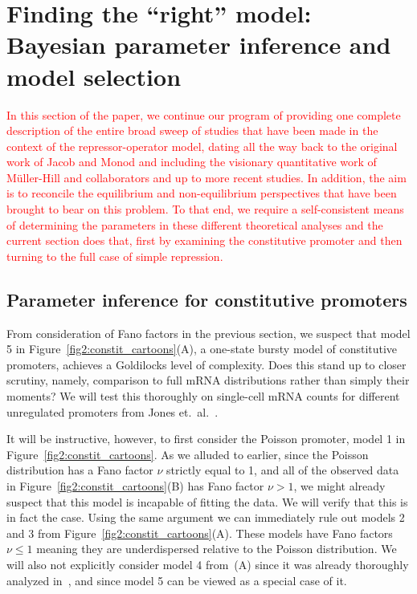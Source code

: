 \section{Finding the ``right'' model: Bayesian parameter inference and model 
selection}
\label{section_04_bayesian_inference}

\textcolor{red}{In this section of the paper, we continue our program of providing
one complete description of the entire broad sweep of studies
that have been made in the context of the repressor-operator model,
dating all the way back to the original work of Jacob and Monod
and including the visionary quantitative work of M\"{u}ller-Hill and collaborators
and up to more recent studies.   In addition, the aim is to reconcile the 
equilibrium and non-equilibrium perspectives that have been brought
to bear on this problem.  To that end, we require a self-consistent means
of determining the parameters in these different theoretical analyses and
the current section does that, first by examining the constitutive promoter
and then turning to the full case of simple repression. }


\subsection{Parameter inference for constitutive promoters}

From consideration of Fano factors in the previous section, we suspect that
model 5 in Figure~\ref{fig2:constit_cartoons}(A), a one-state bursty model of
constitutive promoters, achieves a Goldilocks level of complexity. Does this
stand up to closer scrutiny, namely, comparison to full mRNA distributions
rather than simply their moments? We will test this thoroughly on
single-cell mRNA counts for different unregulated promoters from Jones et.\
al.~\cite{Jones2014}.

It will be instructive, however, to first consider the Poisson promoter, model 1
in Figure~\ref{fig2:constit_cartoons}. As we alluded to earlier, since the
Poisson distribution has a Fano factor $\nu$ strictly equal to 1, and all of
the observed data in Figure~\ref{fig2:constit_cartoons}(B) has Fano factor
$\nu>1$, we might already suspect that this model is incapable of fitting the
data. We will verify that this is in fact the case. Using the same argument we
can immediately rule out models 2 and 3 from
Figure~\ref{fig2:constit_cartoons}(A). These models have Fano factors $\nu\le 1$
meaning they are underdispersed relative to the Poisson distribution. We will
also not explicitly consider model 4 from~\fig{fig2:constit_cartoons}(A) since
it was already thoroughly analyzed in~\cite{Razo-Mejia2020}, and since model 5
can be viewed as a special case of it.

